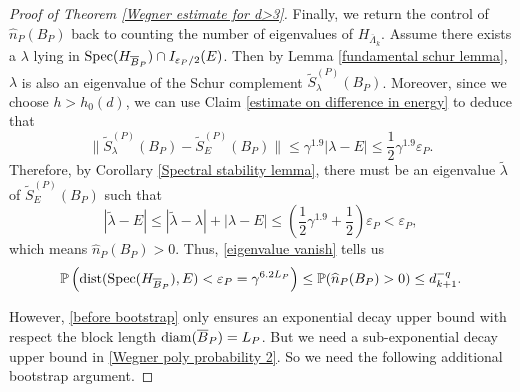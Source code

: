 \documentclass[11pt,reqno,UTF8,twoside]{amsart}
\newcommand{\spec}{{\rm Spec}}
\newcommand{\barLambda}{\overline{\Lambda}}
\renewcommand{\P}{\mathbb{P}}
\newcommand{\whn}{\widehat{n}}
\newcommand{\wtlambda}{\widetilde{\lambda}}
\newcommand{\barB}{\overline{B}}
\newcommand{\dist}{{\rm dist}}
\newcommand{\diam}{{\rm diam}}
\theoremstyle{definition}
\numberwithin{equation}{section}
\begin{document}
\begin{proof}[Proof of Theorem \ref{Wegner estimate for d>3}]
Finally, we return the control of $\whn_P(B_P)$ back to counting  the number of eigenvalues of $H_{\barLambda_k}$. Assume there exists  a $\lambda$ lying in $\spec(H_{\barB_P})\cap I_{\varepsilon_P/2}(E)$.  Then by Lemma \ref{fundamental schur lemma},  $\lambda$ is also an eigenvalue of the Schur complement $\widetilde{S}^{(P)}_\lambda(B_P)$. Moreover, since we choose $h>h_0(d)$, we can use Claim \ref{estimate on difference in energy} to deduce that 
\[ \|\widetilde{S}^{(P)}_\lambda(B_P)-\widetilde{S}^{(P)}_E(B_P)  \|\leq \gamma^{1.9}|\lambda-E|\leq \frac12 \gamma^{1.9} \varepsilon_P .\]
Therefore, by Corollary \ref{Spectral stability lemma}, there must be an eigenvalue $\wtlambda$ of $\widetilde{S}^{(P)}_E(B_P)$ such that 
\[|\wtlambda-E|\leq |\wtlambda-\lambda|+|\lambda-E|\leq \left(\frac{1}{2}\gamma^{1.9}+\frac{1}{2}\right)\varepsilon_P<\varepsilon_P,\]
which means $\whn_P(B_P)>0$. Thus, \eqref{eigenvalue vanish} tells us 
\begin{align}\label{before bootstrap}
  \P\left(\dist(\spec(H_{\barB_P}) , E) <\varepsilon_P=\gamma^{6.2L_P} \right) \leq \P(\whn_P(B_P)>0)\leq d_{k+1}^{-q}.
\end{align}

\bigskip

However, \eqref{before bootstrap} only ensures an exponential decay upper bound with respect the block length $\diam(\barB_P)=L_P$. But we need a sub-exponential decay upper bound in \eqref{Wegner poly probability 2}. So we need the following additional bootstrap argument. 


\end{proof}
\end{document}
